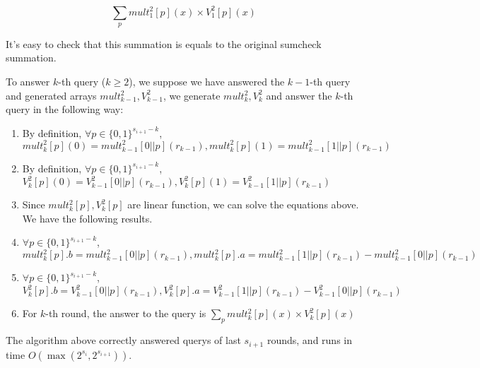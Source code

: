 $$\sum_{p}mult_{1}^2[p](x)\times V_1^2[p](x)$$

It's easy to check that this summation is equals to the original sumcheck summation.

To answer $k$-th query ($k\ge 2$), we suppose we have answered the $k-1$-th query and generated arrays $mult_{k-1}^2, V_{k-1}^2$, we generate $mult_{k}^2, V_{k}^2$ and answer the $k$-th query in the following way:

\begin{enumerate}
	\item By definition, $\forall p \in {\{0, 1\}^{s_{i+1}-k}}$, $mult_{k}^2[p](0)=mult_{k-1}^2[0||p](r_{k-1}), mult_{k}^2[p](1)=mult_{k-1}^2[1||p](r_{k-1})$
	\item By definition, $\forall p \in {\{0, 1\}^{s_{i+1}-k}}$, $V_{k}^2[p](0)=V_{k-1}^2[0||p](r_{k-1}), V_{k}^2[p](1)=V_{k-1}^2[1||p](r_{k-1})$
	\item Since $mult_{k}^2[p], V_{k}^2[p]$ are linear function, we can solve the equations above. We have the following results.
	\item $\forall p \in {\{0, 1\}^{s_{i+1}-k}}$, $mult_{k}^2[p].b = mult_{k-1}^2[0||p](r_{k-1}), mult_{k}^2[p].a = mult_{k-1}^2[1||p](r_{k-1})-mult_{k-1}^2[0||p](r_{k-1})$
	\item $\forall p \in {\{0, 1\}^{s_{i+1}-k}}$, $V_{k}^2[p].b = V_{k-1}^2[0||p](r_{k-1}), V_{k}^2[p].a = V_{k-1}^2[1||p](r_{k-1})-V_{k-1}^2[0||p](r_{k-1})$
	\item For $k$-th round, the answer to the query is $\sum_{p} mult_{k}^2[p](x)\times V_{k}^2[p](x)$
\end{enumerate}

\begin{theorem} The algorithm above correctly answered querys of last $s_{i+1}$ rounds, and runs in time $O(\max(2^{s_{i}}, 2^{s_{i+1}}))$.
\end{theorem}

